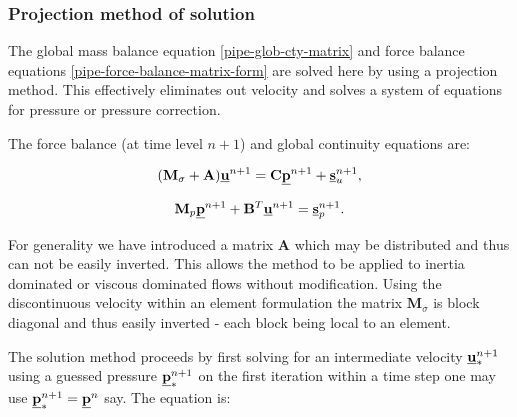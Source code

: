 \subsubsection{Projection method of solution}
\label{pipe-Projection method of solution}

The
global mass balance equation \ref{pipe-glob-cty-matrix} and
force balance equations \ref{pipe-force-balance-matrix-form} are solved here
by using a projection method. This effectively eliminates
out velocity and solves a system of equations for
pressure or pressure correction.

The force balance (at time level $n+1$)
and global continuity equations are:

\begin{equation}
({\mathbf M}_\sigma +{\mathbf A}) \underline{\bf u}^{n+1} = {\mathbf C} \underline{\bf p}^{n+1} + \underline{\bf s}_u^{n+1},
\label{pipe-force-balance-matrix-form2}
\end{equation}

\begin{equation}
{\mathbf M}_p \underline{\bf p}^{n+1} + {\mathbf B}^T \underline{\bf u}^{n+1} = \underline{\bf s}_p^{n+1}.
\label{pipe-glob-cty-matrix2}
\end{equation}

For generality we have introduced a matrix ${\mathbf A}$ which may be
distributed and thus can not be easily inverted.
This allows the method to be applied to inertia dominated
or viscous dominated flows without modification.
Using the discontinuous velocity within an element
formulation the matrix ${\mathbf M}_\sigma$ is block diagonal
and thus easily inverted - each block being local to an element.

The solution method proceeds by first solving for
an intermediate velocity $\underline{\bf u}^{n+1}_*$ using a
guessed pressure $\underline{\bf p}^{n+1}_*$ on the first iteration
within a time step one may use $\underline{\bf p}^{n+1}_*=\underline{\bf p}^n$ say.
The equation is:

